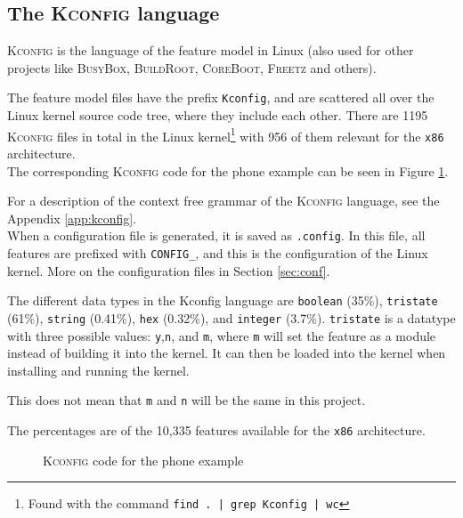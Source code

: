 \documentclass[a4paper,11pt]{report}
\newcommand{\f}{\footnote{\fn}}
\newcommand{\textcode}[1]{\fboxsep=1pt\texttt{\colorbox{gray!20}{#1}}}
\newcommand{\figa}{
    \begin{figure}[!htpb]
    \centering
}
\newcommand{\figb}[2]{
    \caption{#1}
    \label{#2}
    \end{figure}
}
\begin{document}
            \subsection{The \textsc{Kconfig} language} 
\textsc{Kconfig} is the language of the feature model in Linux (also used for 
other projects like \textsc{BusyBox}, \textsc{BuildRoot}, \textsc{CoreBoot}, 
\textsc{Freetz} and others)\cite[p. 4]{VarModSSD}.

            \def \fn{Found with the command \textcode{find . | grep Kconfig | wc}}

The feature model files have the prefix \textcode{Kconfig}, and are 
scattered all over the Linux kernel source code tree, where they include each 
other. There are 1195 \textsc{Kconfig} files in total in the Linux kernel\f
with 956 of them relevant for the \texttt{x86} architecture.
\\

The corresponding \textsc{Kconfig} code for the phone example can be seen in 
Figure \ref{kconfigphone}.

For a description of the context free grammar of 
the \textsc{Kconfig} language, see the Appendix \ref{app:kconfig}.
\\

When a configuration file is generated, it is saved as \texttt{.config}.
In this file, all features are prefixed with \texttt{CONFIG\_}, and this is
the configuration of the Linux kernel. More on the configuration files in
Section  \ref{sec:conf}.

The different data types in the Kconfig language are \textcode{boolean} (35\%), 
\textcode{tristate} (61\%), \textcode{string} (0.41\%), \textcode{hex} 
(0.32\%), and \textcode{integer} (3.7\%). \texttt{tristate} is a datatype 
with three possible values: \texttt{y},\texttt{n}, and \texttt{m}, where 
\texttt{m} will set the feature as a module instead of building it into the 
kernel. It can then be loaded into the kernel when installing and running the 
kernel.

This does not mean that \texttt{m} and \texttt{n} will be the same in this 
project.


The percentages are of the 10,335 features available for the \texttt{x86} 
architecture.


\figa
    
\figb{\textsc{Kconfig} code for the phone example}{kconfigphone}

\end{document}
